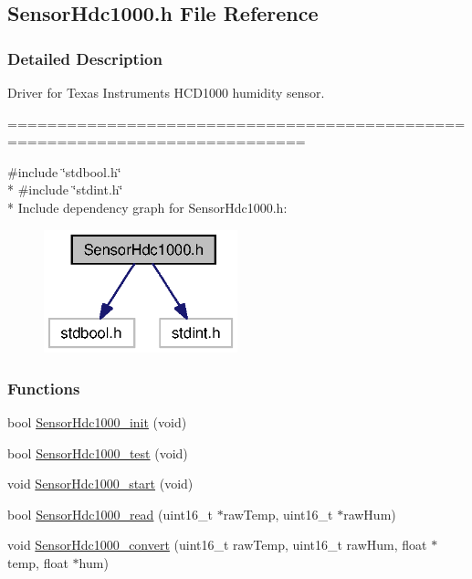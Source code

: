 \subsection{Sensor\+Hdc1000.\+h File Reference}
\label{_sensor_hdc1000_8h}


\subsubsection{Detailed Description}
Driver for Texas Instruments H\+C\+D1000 humidity sensor. 

============================================================================



{\ttfamily \#include \char`\"{}stdbool.\+h\char`\"{}}\\*
{\ttfamily \#include \char`\"{}stdint.\+h\char`\"{}}\\*
Include dependency graph for Sensor\+Hdc1000.\+h\+:
\nopagebreak
\begin{figure}[H]
\begin{center}
\leavevmode
\includegraphics[width=159pt]{_sensor_hdc1000_8h__incl}
\end{center}
\end{figure}
\subsubsection*{Functions}
\begin{DoxyCompactItemize}
\item 
bool \hyperlink{_sensor_hdc1000_8h_a1ae6a63626264c81bb5f113f34ddfca2}{Sensor\+Hdc1000\+\_\+init} (void)
\item 
bool \hyperlink{_sensor_hdc1000_8h_a8b21704587a07306e193c691254139e9}{Sensor\+Hdc1000\+\_\+test} (void)
\item 
void \hyperlink{_sensor_hdc1000_8h_a711f601477e11b1e856724fd45919fb5}{Sensor\+Hdc1000\+\_\+start} (void)
\item 
bool \hyperlink{_sensor_hdc1000_8h_ab469b8359429be6773050dd025a224b4}{Sensor\+Hdc1000\+\_\+read} (uint16\+\_\+t $\ast$raw\+Temp, uint16\+\_\+t $\ast$raw\+Hum)
\item 
void \hyperlink{_sensor_hdc1000_8h_aebb0b020b8dcd1e81d7f0a78e38aeff0}{Sensor\+Hdc1000\+\_\+convert} (uint16\+\_\+t raw\+Temp, uint16\+\_\+t raw\+Hum, float $\ast$temp, float $\ast$hum)
\end{DoxyCompactItemize}


